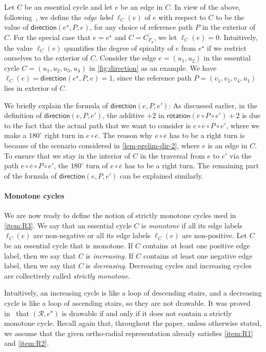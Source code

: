 \documentclass{article}\usepackage[a4paper,margin=20mm]{geometry}
\newcommand{\RR}{\mathcal{R}}
\newcommand{\FO}{F_\mathsf{o}}
\newcommand{\rotation}{\mathsf{rotation}}
\newcommand{\direction}{\mathsf{direction}}
\newcommand{\eref}{e^\star}
\begin{document}
Let $C$ be an essential cycle and let $e$ be an edge in $C$.
In view of the above, following~\cite{barth2023topology}, we define the \emph{edge label} $\ell_C(e)$ of $e$ with respect to $C$ to be the value of $\direction(\eref, P, e)$, for any choice of reference path $P$ in the exterior of $C$. For the special case that $e = \eref$ and $C = \overline{C_{\FO}}$, we let $\ell_C(e) = 0$. Intuitively, the value $\ell_C(e)$ quantifies the degree of spirality of $e$ from $\eref$ if we restrict ourselves to the exterior of $C$.
Consider the edge $e=(u_1, u_2)$ in the essential cycle $C = (u_1, u_2, u_3, u_4)$ in \cref{fig:direction} as an example. We have $\ell_C(e) = \direction(\eref, P, e) = 1$, since the reference path $P=(v_1, v_5, v_4, u_1)$ lies in exterior of $C$. 

We briefly explain the formula of $\direction(e, P, e')$: As discussed earlier, in the definition of  $\direction(e, P, e')$, the additive $+2$ in $\rotation(\overline{e} \circ P \circ e')+2$ is due to the fact that the actual path that we want to consider is $e \circ \overline{e} \circ P \circ e'$, where we make a $180^\circ$ right turn in $e \circ \overline{e}$. The reason why $e \circ \overline{e}$ has to be a right turn is because of the scenario considered in \cref{lem-prelim-dir-2}, where $e$ is an edge in $C$.
To ensure that we stay in the interior of $C$ in the traversal from $e$ to $e'$ via the path $e \circ \overline{e} \circ P \circ e'$, the $180^\circ$ turn of $e \circ \overline{e}$ has to be a right turn. The remaining part of the formula of $\direction(e, P, e')$ can be explained similarly.

\paragraph{Monotone cycles}
We are now ready to define the notion of strictly monotone cycles used in \ref{item:R3}.
We say that an essential cycle $C$ is \emph{monotone} if all its edge labels $\ell_C(e)$ are non-negative or all its edge labels $\ell_C(e)$ are non-positive. 
Let $C$ be an essential cycle that is monotone.
If $C$ contains at least one positive edge label, then we say that $C$ is \emph{increasing}. If $C$ contains at least one negative edge label, then we say that $C$ is \emph{decreasing}. Decreasing cycles and increasing cycles are collectively called \emph{strictly monotone}.

Intuitively, an increasing cycle is like a loop of descending stairs, and a decreasing cycle is like a loop of ascending stairs, so they are not drawable.
It was proved in~\cite{barth2023topology} that $(\RR, \eref)$ is drawable if and only if it does not contain a strictly monotone cycle. Recall again that, throughout the paper, unless otherwise stated, we assume that the given ortho-radial representation already satisfies \ref{item:R1} and \ref{item:R2}.
\end{document}
